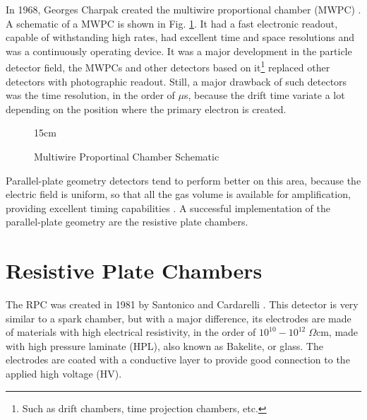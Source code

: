 In 1968, Georges Charpak created the multiwire proportional chamber (MWPC) \cite{Charpak:1968kd}. A schematic of a MWPC is shown in Fig. \ref{fig:MWPCsch}. It had a fast electronic readout, capable of withstanding high rates, had excellent time and space resolutions and was a continuously operating device. It was a major development in the particle detector field, the MWPCs and other detectors based on it\footnote{Such as drift chambers, time projection chambers, etc.} replaced other detectors with photographic readout. Still, a major drawback of such detectors was the time resolution, in the order of $\mu$s, because the drift time variate a lot depending on the position where the primary electron is created. 

\begin{figure}[!htm]{15cm} %
\caption{Multiwire Proportinal Chamber Schematic}%
\label{fig:MWPCsch}
\end{figure}

Parallel-plate geometry detectors tend to perform better on this area, because the electric field is uniform, so that all the gas volume is available for amplification, providing excellent timing capabilities \cite{PARKHOMCHUCK1971269}. A successful implementation of the parallel-plate geometry are the resistive plate chambers.

\section{Resistive Plate Chambers}

The RPC was created in 1981 by Santonico and Cardarelli \cite{santonico1981development}. This detector is very similar to a spark chamber, but with a major difference, its electrodes are made of materials with high electrical resistivity, in the order of $10^{10}-10^{12} \; \Omega$cm, made with high pressure laminate (HPL), also known as Bakelite, or glass. The electrodes are coated with a conductive layer to provide good connection to the applied high voltage (HV). 

